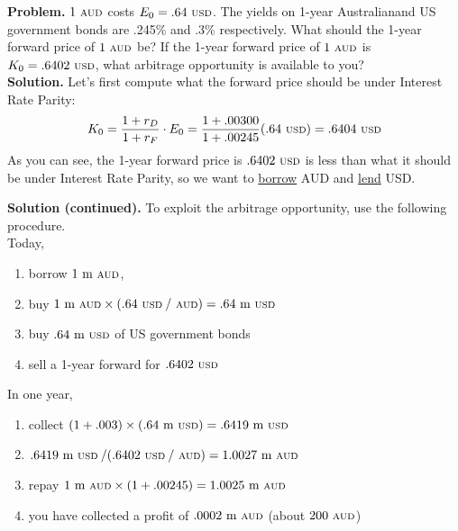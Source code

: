 \documentclass{beamer}
\begin{document}
\begin{frame}{}
	\textbf{Problem.} $1\text{ {\scriptsize AUD}}$ costs $E_{0}=.64\text{ {\scriptsize USD}}$. The yields on 1-year Australianand US government bonds are .245\% and .3\% respectively. What should the 1-year forward price of $1\text{ {\scriptsize AUD}}$ be? If the 1-year forward price of $1\text{ {\scriptsize AUD}}$ is $K_{0}=.6402\text{ {\scriptsize USD}}$, what arbitrage opportunity is available to you?\\ 
\vfill
	\textbf{Solution.} Let's first compute what the forward price should be under Interest Rate Parity:
	\begin{equation}
		K_{0}=\frac{1+r_{D}}{1+r_{F}}\cdot E_{0}=\frac{1+.00300}{1+.00245}(.64\text{ {\scriptsize USD}})=.6404\text{ {\scriptsize USD}}
	\end{equation}
	As you can see, the 1-year forward price is $.6402\text{ {\scriptsize USD}}$ is less than what it should be under Interest Rate Parity, so we want to \underline{borrow} AUD and \underline{lend} USD.
\end{frame}

\begin{frame}{}
	\textbf{Solution (continued).} To exploit the arbitrage opportunity, use the following procedure.\\
	\vfill
	Today, 
	\begin{enumerate}
		\item borrow $1\text{ m {\scriptsize AUD}}$, 
		\item buy $1\text{ m {\scriptsize AUD}}\times(.64\text{ {\scriptsize USD}}\:/\text{ {\scriptsize AUD}})=.64\text{ m {\scriptsize USD}}$
		\item buy $.64\text{ m {\scriptsize USD}}$ of US government bonds
		\item sell a 1-year forward for $.6402\text{ {\scriptsize USD}}$
	\end{enumerate}
	In one year, 
	\begin{enumerate}
		\item collect $(1+.003)\times(.64\text{ m {\scriptsize USD}})=.6419\text{ m {\scriptsize USD}}$
		\item $.6419\text{ m {\scriptsize USD}}\:/(.6402\text{ {\scriptsize USD}}\:/\text{ {\scriptsize AUD}})=1.0027\text{ m {\scriptsize AUD}}$
		\item repay $1\text{ m {\scriptsize AUD}}\times(1+.00245)=1.0025\text{ m {\scriptsize AUD}}$ 
		\item you have collected a profit of $.0002\text{ m {\scriptsize AUD}}$ (about $200\text{ {\scriptsize AUD}}$)
	\end{enumerate}
\end{frame}
\end{document}
